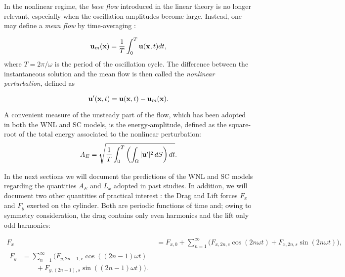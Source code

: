 \documentclass[twocolumn,10pt]{asme2ej}
\newcommand{\be}[1]{ \begin{equation} \label{#1}}
\newcommand{\ee}{\end{equation}}
\begin{document}
In the nonlinear regime, the {\em base flow} introduced in the linear theory is no longer relevant, especially when the oscillation amplitudes become large. 
Instead, one may define a {\em mean flow} by time-averaging : 

\be{defumean}
{\bf u}_m({\bf x})  = \frac{1}{T} \int_0^{T}  {\bf u}({\bf x},t)  dt,
\ee
where $T = 2\pi/\omega$  is the period of the oscillation cycle. The difference between the instantaneous solution and the mean flow is then called the {\em nonlinear perturbation}, defined as 

\be{defuprime}
{\bf u}'({\bf x},t) =   {\bf u}({\bf x},t)-  {\bf u}_m({\bf x}).
\ee

A convenient measure of the unsteady part of the flow, which has been adopted in both the WNL and SC models, is the energy-amplitude, defined as the square-root of the total energy associated to the nonlinear perturbation:
\be{defAnergy}
A_E = \sqrt{\frac{1}{T} \int_0^{T} \left( \int_\Omega | {\bf u}' |^2 \, dS \right) dt}.
\ee

In the next sections we will document the predictions of the WNL and SC models regarding the quantities $A_E$ and $L_x$ adopted in past studies. In addition, we will document two other quantities of practical interest : the Drag and Lift forces $F_x$ and $F_y$ exerted on the cylinder. 
Both are periodic functions of time and; owing to symmetry consideration, the drag contains only even harmonics and the lift only odd harmonics:

\begin{align}
F_x &=F_{x,0} + \sum_{n=1}^\infty \big( F_{x,2n,c} \cos ( 2 n \omega t) + F_{x,2n,s} \sin( 2 n  \omega t ) \big),
\\
\begin{split}
F_y  & =\sum_{n=1}^\infty \big( F_{y,{2n-1},c} \cos ((2n-1) \omega t )\\
             &\qquad + F_{y,(2n-1),s}  \sin ((2n-1) \omega t) \big).
\end{split}
\label{drag_lift_def}
\end{align}
\end{document}
